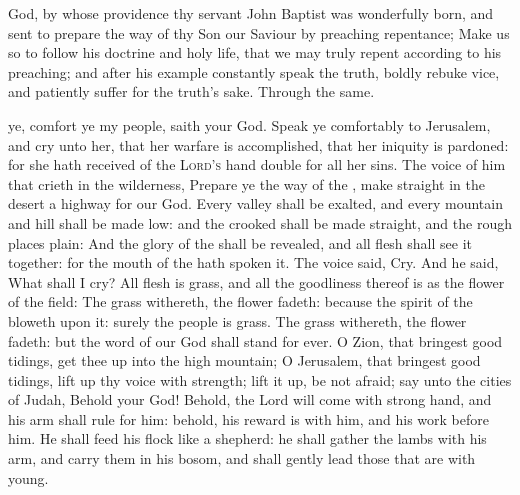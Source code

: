 \collect
\label{JohnCollect}
 God, by whose providence thy servant John Baptist was wonderfully born, and sent to prepare the way of thy Son our Saviour by preaching repentance; Make us so to follow his doctrine and holy life, that we may truly repent according to his preaching; and after his example constantly speak the truth, boldly rebuke vice, and patiently suffer for the truth's sake. Through the same.

 ye, comfort ye my people, saith your God. Speak ye comfortably to Jerusalem, and cry unto her, that her warfare is accomplished, that her iniquity is pardoned: for she hath received of the {\textsc{Lord's}} hand double for all her sins. The voice of him that crieth in the wilderness, Prepare ye the way of the , make straight in the desert a highway for our God. Every valley shall be exalted, and every mountain and hill shall be made low: and the crooked shall be made straight, and the rough places plain: And the glory of the  shall be revealed, and all flesh shall see it together: for the mouth of the  hath spoken it. The voice said, Cry. And he said, What shall I cry? All flesh is grass, and all the goodliness thereof is as the flower of the field: The grass withereth, the flower fadeth: because the spirit of the  bloweth upon it: surely the people is grass. The grass withereth, the flower fadeth: but the word of our God shall stand for ever. O Zion, that bringest good tidings, get thee up into the high mountain; O Jerusalem, that bringest good tidings, lift up thy voice with strength; lift it up, be not afraid; say unto the cities of Judah, Behold your God! Behold, the Lord  will come with strong hand, and his arm shall rule for him: behold, his reward is with him, and his work before him. He shall feed his flock like a shepherd: he shall gather the lambs with his arm, and carry them in his bosom, and shall gently lead those that are with young.


